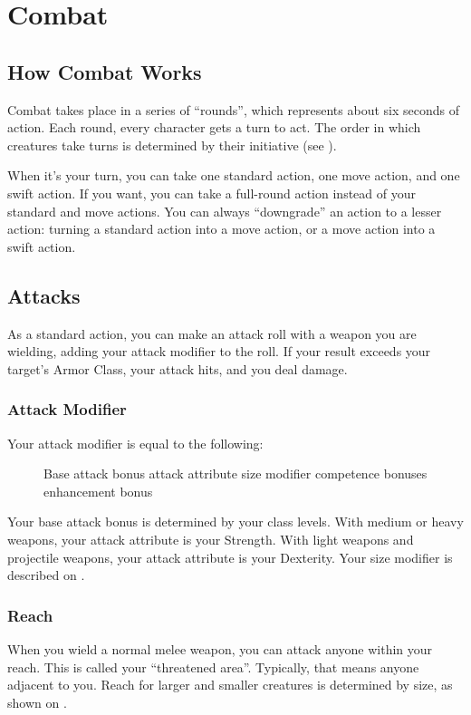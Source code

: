 \chapter{Combat}\label{Combat}

\section{How Combat Works}
Combat takes place in a series of ``rounds'', which represents about six seconds of action. Each round, every character gets a turn to act. The order in which creatures take turns is determined by their initiative (see ). 

When it's your turn, you can take one standard action, one move action, and one swift action. If you want, you can take a full-round action instead of your standard and move actions. You can always ``downgrade'' an action to a lesser action: turning a standard action into a move action, or a move action into a swift action.

\section{Attacks}
As a standard action, you can make an attack roll with a weapon you are wielding, adding your attack modifier to the roll. If your result exceeds your target's Armor Class, your attack hits, and you deal damage.

\subsection{Attack Modifier}
Your attack modifier is equal to the following:

\begin{figure}[h]
\centering Base attack bonus \add attack attribute \add size modifier \add competence bonuses \add enhancement bonus
\end{figure}

Your base attack bonus is determined by your class levels. With medium or heavy weapons, your attack attribute is your Strength. With light weapons and projectile weapons, your attack attribute is your Dexterity. Your size modifier is described on .

\subsection{Reach}
When you wield a normal melee weapon, you can attack anyone within your reach. This is called your ``threatened area''. Typically, that means anyone adjacent to you. Reach for larger and smaller creatures is determined by size, as shown on .

